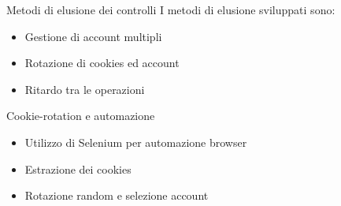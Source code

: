\begin{frame}{Metodi di elusione dei controlli}
I metodi di \alert{elusione} sviluppati sono:
    \begin{itemize}
    \item Gestione di account multipli
    \item Rotazione di cookies ed account
    \item Ritardo tra le operazioni
\end{itemize}
\end{frame}

\begin{frame}{Cookie-rotation e automazione}
    \begin{itemize}
    \item Utilizzo di Selenium per automazione browser
    \item Estrazione dei cookies
    \item Rotazione random e selezione account
\end{itemize}\leavevmode\newline

  \begin{figure}
  \begin{center}
  
\end{center}
\end{figure}
\end{frame}

